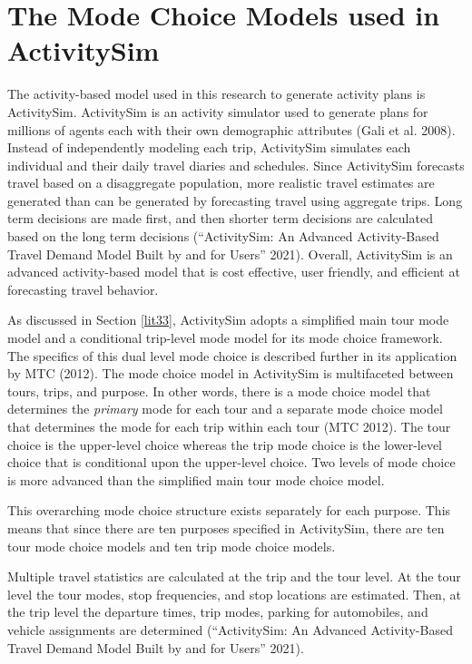 \documentclass[12pt, oneside, openright]{byuthesis}
\begin{document}
\hypertarget{lit4}{%
\section{The Mode Choice Models used in ActivitySim}\label{lit4}}

The activity-based model used in this research to generate activity plans is ActivitySim. ActivitySim is an activity simulator used to generate plans for millions of agents each with their own demographic attributes (Gali et al. 2008). Instead of independently modeling each trip, ActivitySim simulates each individual and their daily travel diaries and schedules. Since ActivitySim forecasts travel based on a disaggregate population, more realistic travel estimates are generated than can be generated by forecasting travel using aggregate trips. Long term decisions are made first, and then shorter term decisions are calculated based on the long term decisions ({``ActivitySim: An Advanced Activity-Based Travel Demand Model Built by and for Users''} 2021). Overall, ActivitySim is an advanced activity-based model that is cost effective, user friendly, and efficient at forecasting travel behavior.

As discussed in Section \ref{lit33}, ActivitySim adopts a simplified main tour mode model and a conditional trip-level mode model for its mode choice framework. The specifics of this dual level mode choice is described further in its application by MTC (2012).
The mode choice model in ActivitySim is multifaceted between tours, trips, and purpose. In other words, there is a mode choice model that determines the \emph{primary} mode for each tour and a separate mode choice model that determines the mode for each trip within each tour (MTC 2012). The tour choice is the upper-level choice whereas the trip mode choice is the lower-level choice that is conditional upon the upper-level choice. Two levels of mode choice is more advanced than the simplified main tour mode choice model.

This overarching mode choice structure exists separately for each purpose. This means that since there are ten purposes specified in ActivitySim, there are ten tour mode choice models and ten trip mode choice models.

Multiple travel statistics are calculated at the trip and the tour level. At the tour level the tour modes, stop frequencies, and stop locations are estimated. Then, at the trip level the departure times, trip modes, parking for automobiles, and vehicle assignments are determined ({``ActivitySim: An Advanced Activity-Based Travel Demand Model Built by and for Users''} 2021).
\end{document}
